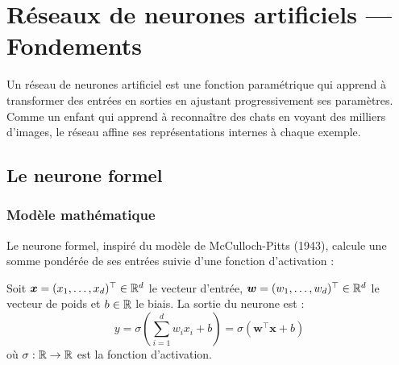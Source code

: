 \chapter{R\'eseaux de neurones artificiels --- Fondements}
\label{ch:reseaux_neurones}

\begin{intuition}
Un r\'eseau de neurones artificiel est une fonction param\'etrique qui apprend \`a transformer des entr\'ees en sorties en ajustant progressivement ses param\`etres. Comme un enfant qui apprend \`a reconna\^itre des chats en voyant des milliers d'images, le r\'eseau affine ses repr\'esentations internes \`a chaque exemple.
\end{intuition}

\section{Le neurone formel}
\label{sec:neurone}

\subsection{Mod\`ele math\'ematique}

Le neurone formel, inspir\'e du mod\`ele de McCulloch-Pitts (1943), calcule une somme pond\'er\'ee de ses entr\'ees suivie d'une fonction d'activation :

\begin{mathbox}[title=\textbf{Neurone formel}]
Soit $\bm{x} = (x_1, \ldots, x_d)^\top \in \mathbb{R}^d$ le vecteur d'entr\'ee, $\bm{w} = (w_1, \ldots, w_d)^\top \in \mathbb{R}^d$ le vecteur de poids et $b \in \mathbb{R}$ le biais. La sortie du neurone est :
\[
y = \sigma\!\left(\sum_{i=1}^d w_i x_i + b\right) = \sigma(\bm{w}^\top \bm{x} + b)
\]
o\`u $\sigma : \mathbb{R} \to \mathbb{R}$ est la fonction d'activation.
\end{mathbox}

\begin{center}
\end{center}

